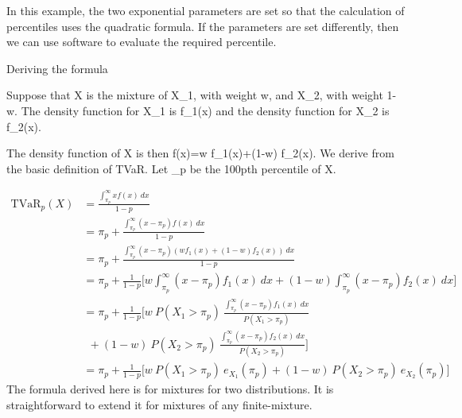 In this example, the two exponential parameters are set so that the calculation of percentiles uses the quadratic formula. If the parameters are set differently, then we can use software to evaluate the required percentile.


Deriving the formula

Suppose that X is the mixture of X_1, with weight w, and X_2, with weight 1-w. The density function for X_1 is f_1(x) and the density function for X_2 is f_2(x). 

The density function of X is then f(x)=w f_1(x)+(1-w) f_2(x). We derive from the basic definition of TVaR. Let \pi_p be the 100pth percentile of X.

 \begin{eqnarray*} \text{TVaR}_p(X)&=\frac{\int_{\pi_p}^\infty x f(x) \ dx}{1-p}\\&=\pi_p+\frac{\int_{\pi_p}^\infty (x-\pi_p) f(x) \ dx}{1-p} \\&=\pi_p+\frac{\int_{\pi_p}^\infty (x-\pi_p) (w f_1(x)+(1-w) f_2(x)) \ dx}{1-p} \\&=\pi_p+\frac{1}{1-p} \biggl[w \int_{\pi_p}^\infty (x-\pi_p) f_1(x) \ dx +(1-w) \int_{\pi_p}^\infty (x-\pi_p) f_2(x) \ dx\biggr] \\&=\pi_p+\frac{1}{1-p} \biggl[w \   P(X_1>\pi_p) \ \frac{\int_{\pi_p}^\infty (x-\pi_p) f_1(x) \ dx}{P(X_1>\pi_p)}\\& \ \  +(1-w) \ P(X_2>\pi_p) \ \frac{\int_{\pi_p}^\infty (x-\pi_p) f_2(x) \ dx}{P(X_2>\pi_p)} \biggr] \\&=\pi_p+\frac{1}{1-p} \biggl[w \   P(X_1>\pi_p) \ e_{X_1}(\pi_p) +(1-w) \ P(X_2>\pi_p) \ e_{X_2}(\pi_p) \biggr] \end{eqnarray*}
The formula derived here is for mixtures for two distributions. It is straightforward to extend it for mixtures of any finite-mixture.


